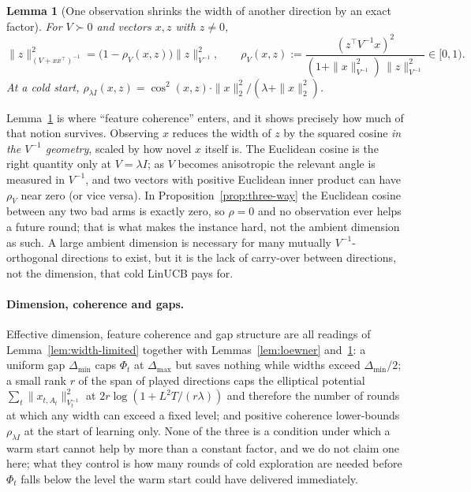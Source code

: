 \documentclass{article}
\newtheorem{lemma}{Lemma}
\theoremstyle{definition}
\theoremstyle{remark}
\theoremstyle{remark}
\begin{document}
\begin{lemma}[One observation shrinks the width of another direction by an
exact factor]
\label{lem:transfer}
For $V\succ0$ and vectors $x,z$ with $z\ne0$,
\[
\|z\|^2_{(V+xx^\top)^{-1}}=\bigl(1-\rho_V(x,z)\bigr)\|z\|^2_{V^{-1}},
\qquad
\rho_V(x,z):=\frac{(z^\top V^{-1}x)^2}{(1+\|x\|^2_{V^{-1}})\,\|z\|^2_{V^{-1}}}\in[0,1).
\]
At a cold start, $\rho_{\lambda I}(x,z)=\cos^2(x,z)\cdot\|x\|_2^2/(\lambda+\|x\|_2^2)$.
\end{lemma}

Lemma~\ref{lem:transfer} is where ``feature coherence'' enters, and it shows
precisely how much of that notion survives. Observing $x$ reduces the width of
$z$ by the squared cosine \emph{in the $V^{-1}$ geometry}, scaled by how novel
$x$ itself is. The Euclidean cosine is the right quantity only at $V=\lambda I$;
as $V$ becomes anisotropic the relevant angle is measured in $V^{-1}$, and two
vectors with positive Euclidean inner product can have $\rho_V$ near zero (or
vice versa). In Proposition~\ref{prop:three-way} the Euclidean cosine between
any two bad arms is exactly zero, so $\rho=0$ and no observation ever helps a
future round; that is what makes the instance hard, not the ambient dimension
as such. A large ambient dimension is necessary for many mutually
$V^{-1}$-orthogonal directions to exist, but it is the lack of carry-over
between directions, not the dimension, that cold LinUCB pays for.

\paragraph{Dimension, coherence and gaps.}
Effective dimension, feature coherence and gap structure are all readings of
Lemma~\ref{lem:width-limited} together with Lemmas~\ref{lem:loewner}
and~\ref{lem:transfer}: a uniform gap $\Delta_{\min}$ caps $\Phi_t$ at
$\Delta_{\max}$ but saves nothing while widths exceed $\Delta_{\min}/2$; a small
rank $r$ of the span of played directions caps the elliptical potential
$\sum_t\|x_{t,A_t}\|^2_{V_t^{-1}}$ at $2r\log(1+L^2T/(r\lambda))$ and therefore
the number of rounds at which any width can exceed a fixed level; and positive
coherence lower-bounds $\rho_{\lambda I}$ at the start of learning only. None
of the three is a condition under which a warm start cannot help by more than
a constant factor, and we do not claim one here; what they control is how
many rounds of cold exploration are needed before $\Phi_t$ falls below the
level the warm start could have delivered immediately.
\end{document}
